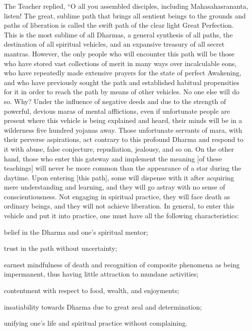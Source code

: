 \documentclass[a4paper,11pt,twoside,final]{book}
\begin{document}
The Teacher replied, ``O all you assembled disciples, including
Mahasahasrananta, listen! The great, sublime path that brings all
sentient beings to the grounds and paths of liberation is called the
swift path of the clear light Great Perfection. This is the most
sublime of all Dharmas, a general synthesis of all paths, the
destination of all spiritual vehicles, and an expansive treasury of
all secret mantras. However, the only people who will encounter this
path will be those who have stored vast collections of merit in many
ways over incalculable eons, who have repeatedly made extensive
prayers for the state of perfect Awakening, and who have previously
sought the path and established habitual propensities for it in order
to reach the path by means of other vehicles. No one else will do
so. Why? Under the influence of negative deeds and due to the strength
of powerful, devious maras of mental afflictions, even if unfortunate
people are present where this vehicle is being explained and heard,
their minds will be in a wilderness five hundred yojanas away.  Those
unfortunate servants of mara, with their perverse aspirations, act
contrary to this profound Dharma and respond to it with abuse, false
conjecture, repudiation, jealousy, and so on.  On the other hand,
those who enter this gateway and implement the meaning [of these
teachings] will never be more common than the appearance of a star
during the daytime. Upon entering [this path], some will dispense with
it after acquiring mere understanding and learning, and they will go
astray with no sense of conscientiousness. Not engaging in spiritual
practice, they will face death as ordinary beings, and they will not
achieve liberation.  In general, to enter this vehicle and put it into
practice, one must have all the following characteristics:
\begin{itemize*}

  \item belief in the Dharma and one's spiritual mentor;

  \item trust in the path without uncertainty;

  \item earnest mindfulness of death and recognition of composite
    phenomena as being impermanent, thus having little attraction to
    mundane activities;

  \item contentment with respect to food, wealth, and enjoyments;

  \item insatiability towards Dharma due to great zeal and
    determination;

  \item unifying one's life and spiritual practice without
    complaining.

\end{itemize*}
\end{document}
